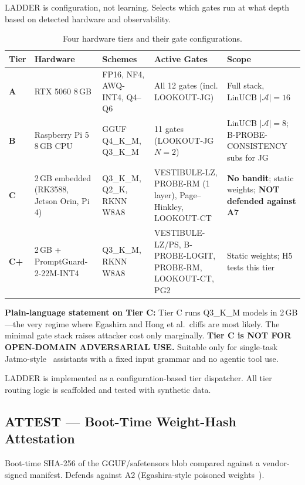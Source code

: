 \documentclass[11pt,a4paper]{article}
\begin{document}
LADDER is configuration, not learning. Selects which gates run at what depth based
on detected hardware and observability.

\begin{table}[H]
  \centering
  \small
  \caption{Four hardware tiers and their gate configurations.}
  \label{tab:tiers}
  \begin{tabular}{@{}lp{2.8cm}p{2.2cm}p{4.2cm}l@{}}
    \toprule
    Tier & Hardware & Schemes & Active Gates & Scope \\
    \midrule
    \textbf{A} & RTX 5060 8\,GB & FP16, NF4, AWQ-INT4, Q4--Q6 & All 12 gates (incl. LOOKOUT-JG) & Full stack, LinUCB $|\mathcal{A}|=16$ \\[3pt]
    \textbf{B} & Raspberry Pi 5 8\,GB CPU & GGUF Q4\_K\_M, Q3\_K\_M & 11 gates (LOOKOUT-JG $N=2$) & LinUCB $|\mathcal{A}|=8$; B-PROBE-CONSISTENCY subs for JG \\[3pt]
    \textbf{C} & 2\,GB embedded (RK3588, Jetson Orin, Pi 4) & Q3\_K\_M, Q2\_K, RKNN W8A8 & VESTIBULE-LZ, PROBE-RM (1 layer), Page--Hinkley, LOOKOUT-CT & \textbf{No bandit}; static weights; \textbf{NOT defended against A7} \\[3pt]
    \textbf{C+} & 2\,GB + PromptGuard-2-22M-INT4 & Q3\_K\_M, RKNN W8A8 & VESTIBULE-LZ/PS, B-PROBE-LOGIT, PROBE-RM, LOOKOUT-CT, PG2 & Static weights; H5 tests this tier \\
    \bottomrule
  \end{tabular}
\end{table}

\noindent\textbf{Plain-language statement on Tier C:}
Tier C runs Q3\_K\_M models in 2\,GB---the very regime where Egashira and Hong
et al.\ cliffs are most likely.
The minimal gate stack raises attacker cost only marginally.
\textbf{Tier C is NOT FOR OPEN-DOMAIN ADVERSARIAL USE.}
Suitable only for single-task Jatmo-style~\citep{jatmo2023} assistants with a fixed
input grammar and no agentic tool use.

\begin{scaffoldbox}
LADDER is implemented as a configuration-based tier dispatcher. All tier routing
logic is scaffolded and tested with synthetic data.
\end{scaffoldbox}

\subsection{ATTEST — Boot-Time Weight-Hash Attestation}

Boot-time SHA-256 of the GGUF/safetensors blob compared against a vendor-signed
manifest.
Defends against A2 (Egashira-style poisoned weights~\citep{egashira2024exploiting}).
\end{document}
